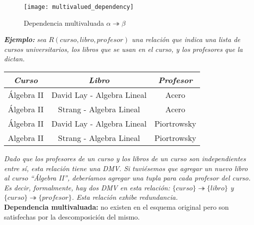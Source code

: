 \documentclass[a4paper, twoside]{article}
\begin{document}
\begin{figure}[H]
	\centering
	\texttt{[image: multivalued\_dependency]}
	\caption{Dependencia multivaluada $\alpha \twoheadrightarrow \beta$}
\end{figure}

\textbf{\emph{Ejemplo:}} \emph{sea $R(curso, libro, profesor)$ una relación que indica una lista de cursos universitarios, los libros que se usan en el curso, y los profesores que la dictan.}

\begin{center}
	\begin{tabular}{|c|c|c|}
		\hline 
		\emph{Curso} & \emph{Libro} & \emph{Profesor}\\
		\hline 
		\hline 
		Álgebra II & David Lay - Algebra Lineal & Acero\\
		\hline 
		Álgebra II & Strang - Algebra Lineal & Acero\\
		\hline 
		Álgebra II & David Lay - Algebra Lineal & Piortrowsky\\
		\hline 
		Algebra II & Strang - Algebra Lineal & Piortrowsky\\
		\hline 
	\end{tabular}
\end{center}

\emph{Dado que los profesores de un curso y los libros de un curso son independientes entre sí, esta relación tiene una DMV. Si tuviésemos que agregar un nuevo libro al curso ``Álgebra II'', deberíamos agregar una tupla para cada profesor del curso. Es decir, formalmente, hay dos DMV en esta relación: $\{curso\} \twoheadrightarrow \{libro\}$
y $\{curso\} \twoheadrightarrow \{profesor\}$. Esta relación exhibe redundancia.}\\

\textbf{Dependencia multivaluada:} no existen en el esquema original pero son satisfechas por la descomposición del mismo.
\end{document}

